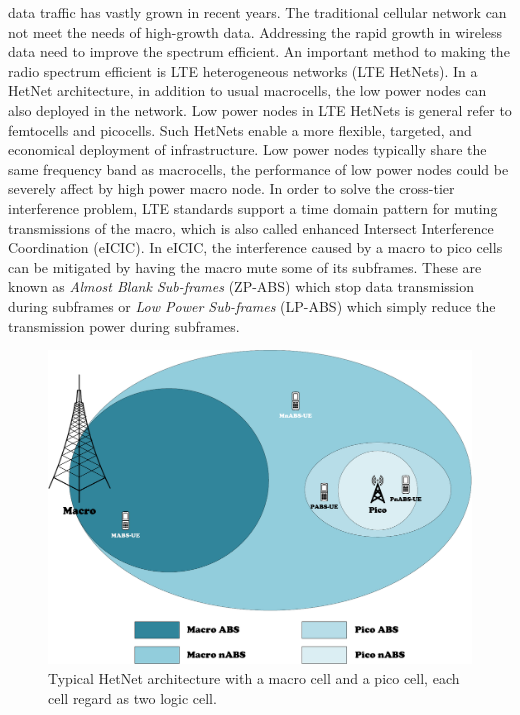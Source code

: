 \documentclass[journal]{IEEETran}
\begin{document}
 data traffic has vastly grown in recent years. The traditional cellular network can not meet the needs of high-growth data. Addressing the rapid growth in wireless data need to improve the spectrum efficient. An important method to making the radio spectrum efficient is LTE heterogeneous networks (LTE HetNets)\cite{OverviewHetNets}. In a HetNet architecture, in addition to usual macrocells, the low power nodes can also deployed in the network. Low power nodes in LTE HetNets is general refer to femtocells and picocells. Such HetNets enable a more flexible, targeted, and economical deployment of infrastructure. Low power nodes typically share the same frequency band as macrocells, the performance of low power nodes could be severely affect by high power macro node. In order to solve the cross-tier interference problem, LTE standards support a time domain pattern for muting transmissions of the macro\cite{eICICIntroduction}, which is also called enhanced Intersect Interference Coordination (eICIC). In eICIC, the interference caused by a macro to pico cells can be mitigated by having the macro mute some of its subframes. These are known as \textit{Almost Blank Sub-frames} (ZP-ABS) which stop data transmission during subframes or \textit{Low Power Sub-frames} (LP-ABS) which simply reduce the transmission power during subframes.

\begin{figure}[htpb]
\centering
\includegraphics[width=.5\textwidth]{macroAndPico.pdf}
\caption{Typical HetNet architecture with a macro cell and a pico cell, each cell regard as two logic cell.}
\label{F_macroAndPico}
\end{figure}
\end{document}

